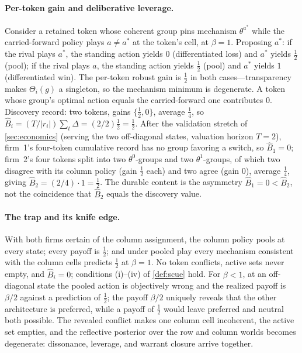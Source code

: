 \documentclass[11pt]{article}
\theoremstyle{definition}
\begin{document}
\paragraph{Per-token gain and deliberative leverage.}
Consider a retained token whose coherent group pins mechanism $\theta^{a^{*}}$ while the carried-forward policy plays $a\neq a^{*}$ at the token's cell, at $\beta=1$.
Proposing $a^{*}$: if the rival plays $a^{*}$, the standing action yields $0$ (differentiated loss) and $a^{*}$ yields $\tfrac12$ (pool); if the rival plays $a$, the standing action yields $\tfrac12$ (pool) and $a^{*}$ yields $1$ (differentiated win).
The per-token robust gain is $\tfrac12$ in both cases---transparency makes $\Theta_i(g)$ a singleton, so the mechanism minimum is degenerate.
A token whose group's optimal action equals the carried-forward one contributes $0$.
Discovery record: two tokens, gains $\{\tfrac12,0\}$, average $\tfrac14$, so $\widehat B_i=(T/\lvert r_i\rvert)\sum_t\Delta=(2/2)\tfrac12=\tfrac12$.
After the validation stretch of \cref{sec:economics} (serving the two off-diagonal states, valuation horizon $T=2$), firm~1's four-token cumulative record has no group favoring a switch, so $\widehat B_1=0$; firm~2's four tokens split into two $\theta^0$-groups and two $\theta^1$-groups, of which two disagree with its column policy (gain $\tfrac12$ each) and two agree (gain $0$), average $\tfrac14$, giving $\widehat B_2=(2/4)\cdot 1=\tfrac12$.
The durable content is the asymmetry $\widehat B_1=0<\widehat B_2$, not the coincidence that $\widehat B_2$ equals the discovery value.

\paragraph{The trap and its knife edge.}
With both firms certain of the column assignment, the column policy pools at every state; every payoff is $\tfrac12$; and under pooled play every mechanism consistent with the column cells predicts $\tfrac12$ at $\beta=1$.
No token conflicts, active sets never empty, and $\widehat B_i=0$; conditions (i)--(iv) of \cref{def:scue} hold.
For $\beta<1$, at an off-diagonal state the pooled action is objectively wrong and the realized payoff is $\beta/2$ against a prediction of $\tfrac12$; the payoff $\beta/2$ uniquely reveals that the other architecture is preferred, while a payoff of $\tfrac12$ would leave preferred and neutral both possible.
The revealed conflict makes one column cell incoherent, the active set empties, and the reflective posterior over the row and column worlds becomes degenerate: dissonance, leverage, and warrant closure arrive together.
\end{document}

